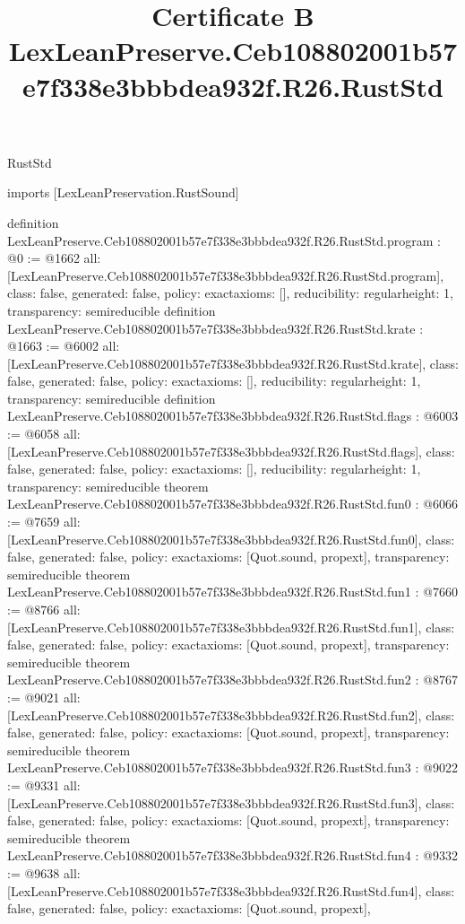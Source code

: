 \begin{lexlean}{RustStd}
\title{Certificate B LexLeanPreserve.Ceb108802001b57e7f338e3bbbdea932f.R26.RustStd}
\begin{coremodule}
imports [LexLeanPreservation.RustSound]

definition LexLeanPreserve.Ceb108802001b57e7f338e3bbbdea932f.R26.RustStd.program : @0 := @1662 {
  all: [LexLeanPreserve.Ceb108802001b57e7f338e3bbbdea932f.R26.RustStd.program],
  class: false,
  generated: false,
  policy: exact{axioms: []},
  reducibility: regular{height: 1},
  transparency: semireducible
}
definition LexLeanPreserve.Ceb108802001b57e7f338e3bbbdea932f.R26.RustStd.krate : @1663 := @6002 {
  all: [LexLeanPreserve.Ceb108802001b57e7f338e3bbbdea932f.R26.RustStd.krate],
  class: false,
  generated: false,
  policy: exact{axioms: []},
  reducibility: regular{height: 1},
  transparency: semireducible
}
definition LexLeanPreserve.Ceb108802001b57e7f338e3bbbdea932f.R26.RustStd.flags : @6003 := @6058 {
  all: [LexLeanPreserve.Ceb108802001b57e7f338e3bbbdea932f.R26.RustStd.flags],
  class: false,
  generated: false,
  policy: exact{axioms: []},
  reducibility: regular{height: 1},
  transparency: semireducible
}
theorem LexLeanPreserve.Ceb108802001b57e7f338e3bbbdea932f.R26.RustStd.fun0 : @6066 := @7659 {
  all: [LexLeanPreserve.Ceb108802001b57e7f338e3bbbdea932f.R26.RustStd.fun0],
  class: false,
  generated: false,
  policy: exact{axioms: [Quot.sound, propext]},
  transparency: semireducible
}
theorem LexLeanPreserve.Ceb108802001b57e7f338e3bbbdea932f.R26.RustStd.fun1 : @7660 := @8766 {
  all: [LexLeanPreserve.Ceb108802001b57e7f338e3bbbdea932f.R26.RustStd.fun1],
  class: false,
  generated: false,
  policy: exact{axioms: [Quot.sound, propext]},
  transparency: semireducible
}
theorem LexLeanPreserve.Ceb108802001b57e7f338e3bbbdea932f.R26.RustStd.fun2 : @8767 := @9021 {
  all: [LexLeanPreserve.Ceb108802001b57e7f338e3bbbdea932f.R26.RustStd.fun2],
  class: false,
  generated: false,
  policy: exact{axioms: [Quot.sound, propext]},
  transparency: semireducible
}
theorem LexLeanPreserve.Ceb108802001b57e7f338e3bbbdea932f.R26.RustStd.fun3 : @9022 := @9331 {
  all: [LexLeanPreserve.Ceb108802001b57e7f338e3bbbdea932f.R26.RustStd.fun3],
  class: false,
  generated: false,
  policy: exact{axioms: [Quot.sound, propext]},
  transparency: semireducible
}
theorem LexLeanPreserve.Ceb108802001b57e7f338e3bbbdea932f.R26.RustStd.fun4 : @9332 := @9638 {
  all: [LexLeanPreserve.Ceb108802001b57e7f338e3bbbdea932f.R26.RustStd.fun4],
  class: false,
  generated: false,
  policy: exact{axioms: [Quot.sound, propext]},
}
\end{coremodule}
\end{lexlean}
